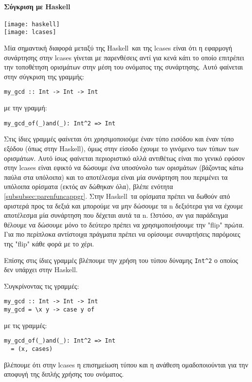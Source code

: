 \documentclass[diploma]{softlab-thesis}
\def\H{Haskell}
\begin{document}
\newpage
\paragraph{Σύγκριση με \H}
\begin{center}
\texttt{[image: haskell]}\\
\vspace{0.2cm}
\texttt{[image: lcases]}
\end{center}

Μία σημαντική διαφορά μεταξύ της \H\ και της lcases είναι ότι η εφαρμογή
συνάρτησης στην lcases γίνεται με παρενθέσεις αντί για κενά κάτι το οποίο
επιτρέπει την τοποθέτηση ορισμάτων στην μέση του ονόματος της συνάρτησης.
Αυτό φαίνεται στην σύγκριση της γραμμής:
\begin{verbatim}
my_gcd :: Int -> Int -> Int
\end{verbatim}
με την γραμμή:
\begin{verbatim}
my_gcd_of(_)and(_): Int^2 => Int
\end{verbatim}

Στις ίδιες γραμμές φαίνεται ότι χρησιμοποιούμε έναν τύπο εισόδου και έναν τύπο
εξόδου (όπως στην \H), όμως στην είσοδο έχουμε το γινόμενο των τύπων των
ορισμάτων. Αυτό ίσως φαίνεται περιοριστικό αλλά αντιθέτως είναι πιο γενικό
εφόσον στην lcases είναι εφικτό να δώσουμε ένα υποσύνολο των ορισμάτων
(βάζοντας κάτω παύλα στα υπόλοιπα) και το αποτέλεσμα είναι μία συνάρτηση
που περιμένει τα υπόλοιπα ορίσματα (εκτός αν δώθηκαν όλα), βλέπε ενότητα
\ref{subsubsec:parenfuncappgr}. Στην \H\ τα ορίσματα πρέπει να δωθούν από
αριστερά προς τα δεξιά και μπορούμε να μην δώσουμε τα n δεξιότερα για να
έχουμε αποτέλεσμα μία συνάρτηση που δέχεται αυτά τα n. Ωστόσο, αν για
παράδειγμα θέλουμε να δώσουμε μόνο το δεύτερο πρέπει να χρησιμοποιήσουμε την
"flip" πρώτα. Για πιο περίπλοκα αντίστοιχα πράγματα πρέπει να ορίσουμε
συναρτήσεις παρόμοιες της "flip" κάθε φορά με το χέρι.

Επίσης στις ίδιες γραμμές βλέπουμε την χρήση του τύπου δύναμης \verb|Int^2|
ο οποίος δεν υπάρχει στην \H.

Συγκρίνοντας τις γραμμές:
\begin{verbatim}
my_gcd :: Int -> Int -> Int
my_gcd = \x y -> case y of
\end{verbatim}
με τις γραμμές:
\begin{verbatim}
my_gcd_of(_)and(_): Int^2 => Int
  = (x, cases)
\end{verbatim}
βλέπουμε ότι στην lcases η επισημείωση τύπου και η ανάθεση ομαδοποιούνται για
την αποφυγή της διπλής χρήσης του ονόματος.
\end{document}
